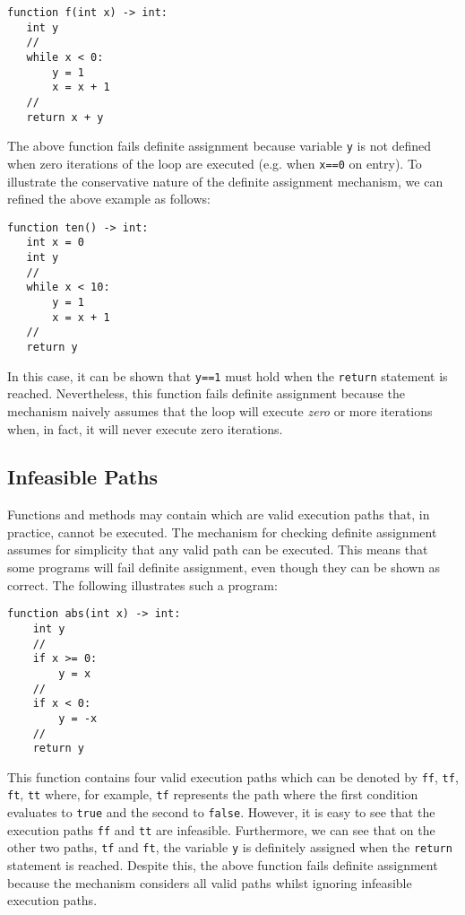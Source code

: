 \begin{lstlisting}
function f(int x) -> int:
   int y
   //
   while x < 0:
       y = 1
       x = x + 1
   //
   return x + y
\end{lstlisting}

The above function fails definite assignment because variable \lstinline{y} is not defined when zero iterations of the loop are executed (e.g. when \lstinline{x==0} on entry).  To illustrate the conservative nature of the definite assignment mechanism, we can refined the above example as follows:

\begin{lstlisting}
function ten() -> int:
   int x = 0
   int y
   //
   while x < 10:
       y = 1
       x = x + 1
   //
   return y
\end{lstlisting}

In this case, it can be shown that \lstinline{y==1} must hold when the \lstinline{return} statement is reached.  Nevertheless, this function fails definite assignment because the mechanism naively assumes that the loop will execute {\em zero} or more iterations when, in fact, it will never execute zero iterations.

\subsection{Infeasible Paths}

Functions and methods may contain  which are valid execution paths that, in practice, cannot be executed.  The mechanism for checking definite assignment assumes for simplicity that any valid path can be executed.  This means that some programs will fail definite assignment, even though they can be shown as correct.   The following illustrates such a program:

\begin{lstlisting}
function abs(int x) -> int:
    int y
    //
    if x >= 0:
        y = x
    //
    if x < 0:
        y = -x
    //
    return y
\end{lstlisting}

This function contains four valid execution paths which can be denoted by \lstinline{ff}, \lstinline{tf}, \lstinline{ft}, \lstinline{tt} where, for example, \lstinline{tf} represents the path where the first condition evaluates to \lstinline{true} and the second to \lstinline{false}.  However, it is easy to see that the execution paths \lstinline{ff} and \lstinline{tt} are infeasible.  Furthermore, we can see that on the other two paths, \lstinline{tf} and \lstinline{ft}, the variable \lstinline{y} is definitely assigned when the \lstinline{return} statement is reached.  Despite this, the above function fails definite assignment because the mechanism considers all valid paths whilst ignoring infeasible execution paths.

